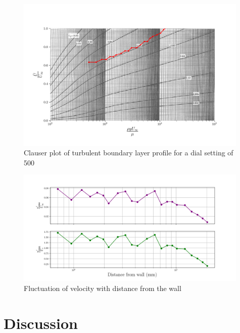 \documentclass{article}
\begin{document}

\begin{figure}[H]
    \centering
    \includegraphics[width=0.99\textwidth]{clauser_data.png}
    \caption{Clauser plot of turbulent boundary layer profile for a dial setting of 500}
    \label{fig:clauser}
\end{figure}

\begin{figure}[H]
    \centering
    \includegraphics[width=0.99\textwidth]{u_fluctuation.png}
    \caption{Fluctuation of velocity with distance from the wall}
    \label{fig:fluctuation}
\end{figure}


\section{Discussion}
\end{document}
